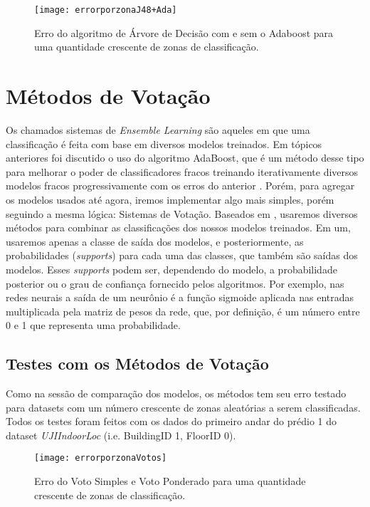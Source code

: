 \begin{figure}[!hb]
	\centering
	\caption{Erro do algoritmo de Árvore de Decisão com e sem o Adaboost  para uma quantidade crescente de zonas de classificação.}
  \texttt{[image: errorporzonaJ48+Ada]}
\label{fig:zonaAda}  

\end{figure}

\clearpage


\section{Métodos de Votação}

Os chamados sistemas de \textit{Ensemble Learning} são aqueles em que uma classificação é feita com base em diversos modelos treinados. Em tópicos anteriores foi discutido o uso do algoritmo AdaBoost, que é um método desse tipo para melhorar o poder de classificadores fracos treinando iterativamente diversos modelos fracos progressivamente com os erros do anterior \cite {explainingadaboost}. Porém, para agregar os modelos usados até agora, iremos implementar algo mais simples, porém seguindo a mesma lógica: Sistemas de Votação. Baseados em \cite{Nagi2013}, usaremos diversos métodos para combinar as classificações dos nossos modelos treinados. Em um, usaremos apenas a classe de saída dos modelos, e posteriormente, as probabilidades (\textit{supports}) para cada uma das classes, que também são saídas dos modelos. Esses \textit{supports} podem ser, dependendo do modelo, a probabilidade posterior ou o grau de confiança fornecido pelos algoritmos. Por exemplo, nas redes neurais a saída de um neurônio é a função sigmoide aplicada nas entradas multiplicada pela matriz de pesos da rede, que, por definição, é um número entre 0 e 1 que representa uma probabilidade. 




\subsection{Testes com os Métodos de Votação}

Como na sessão de comparação dos modelos, os métodos tem seu erro testado para datasets com um número crescente de zonas aleatórias a serem classificadas. Todos os testes foram feitos com os dados do primeiro andar do prédio 1 do dataset \textit{UJIIndoorLoc} (i.e. BuildingID 1, FloorID 0).




\begin{figure}[!ht]
	\centering
	\caption{Erro do Voto Simples e Voto Ponderado para uma quantidade crescente de zonas de classificação.}
  \texttt{[image: errorporzonaVotos]}
\label{fig:zonaVotos}  

\end{figure}



